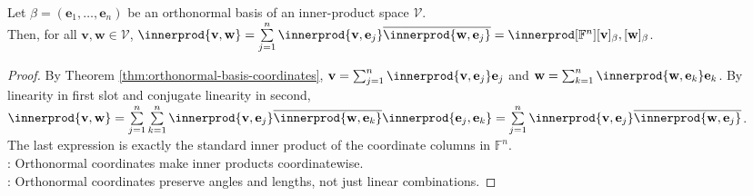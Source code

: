 \begin{theorem} \label{thm:parseval-identity-finite-dimensional} \\
Let $\beta=(\mathbf{e}_1,\ldots,\mathbf{e}_n)$ be an orthonormal basis of an inner-product space $\mathcal{V}$.\\
Then, for all $\mathbf{v},\mathbf{w}\in\mathcal{V}$, $\innerprod{\mathbf{v},\mathbf{w}} =\sum\limits_{j=1}^{n}\innerprod{\mathbf{v},\mathbf{e}_j}\overline{\innerprod{\mathbf{w},\mathbf{e}_j}} =\innerprod[\mathbb{F}^n]{[\mathbf{v}]_{\beta},[\mathbf{w}]_{\beta}}$.
\begin{proof}
By Theorem \ref{thm:orthonormal-basis-coordinates}, $\mathbf{v}=\sum_{j=1}^{n}\innerprod{\mathbf{v},\mathbf{e}_j}\mathbf{e}_j$ and $\mathbf{w}=\sum_{k=1}^{n}\innerprod{\mathbf{w},\mathbf{e}_k}\mathbf{e}_k$. By linearity in first slot and conjugate linearity in second, $\innerprod{\mathbf{v},\mathbf{w}} =\sum\limits_{j=1}^{n}\sum\limits_{k=1}^{n} \innerprod{\mathbf{v},\mathbf{e}_j}\overline{\innerprod{\mathbf{w},\mathbf{e}_k}} \innerprod{\mathbf{e}_j,\mathbf{e}_k} =\sum\limits_{j=1}^{n}\innerprod{\mathbf{v},\mathbf{e}_j}\overline{\innerprod{\mathbf{w},\mathbf{e}_j}}$.\\
The last expression is exactly the standard inner product of the coordinate columns in $\mathbb{F}^n$.\\
: Orthonormal coordinates make inner products coordinatewise.\\
: Orthonormal coordinates preserve angles and lengths, not just linear combinations.
\end{proof}
\end{theorem}

